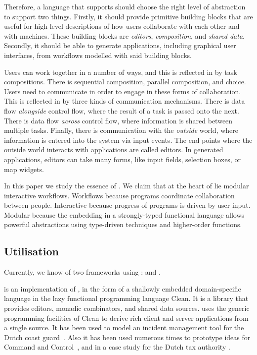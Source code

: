 Therefore,
a language that supports \TOP should choose the right level of abstraction to support two things.
Firstly, it should provide primitive building blocks that are useful for high-level descriptions of how users collaborate with each other and with machines.
These building blocks are \emph{editors}, \emph{composition}, and \emph{shared data}.
Secondly, it should be able to generate applications, including graphical user interfaces, from workflows modelled with said building blocks.

Users can work together in a number of ways, and this is reflected in \TOP by task compositions.
There is sequential composition, parallel composition, and choice.
Users need to communicate in order to engage in these forms of collaboration.
This is reflected in \TOP by three kinds of communication mechanisms.
There is data flow \emph{alongside} control flow, where the result of a task is passed onto the next.
There is data flow \emph{across} control flow, where information is shared between multiple tasks.
Finally, there is communication with the \emph{outside} world, where information is entered into the system via input events.
The end points where the outside world interacts with \TOP applications are called editors.
In generated applications, editors can take many forms, like input fields, selection boxes, or map widgets.

In this paper we study the essence of \TOP.
We claim that at the heart of \TOP lie modular interactive workflows.
Workflows because \TOP programs coordinate collaboration between people.
Interactive because progress of \TOP programs is driven by user input.
Modular because the embedding in a strongly-typed functional language allows powerful abstractions using type-driven techniques and higher-order functions.



\subsection{Utilisation}


Currently, we know of two frameworks using \TOP: \ITASKS and \MTASKS.

\ITASKS is an implementation of \TOP, in the form of a shallowly embedded domain-specific language in the lazy functional programming language Clean.
It is a library that provides editors, monadic combinators, and shared data sources.
\ITASKS uses the generic programming facilities of Clean to derive rich client and server applications from a single source.
It has been used to model an incident management tool for the Dutch coast guard~\cite{conf/iscram/LijnseJP12}.
Also it has been used numerous times to prototype ideas for Command and Control~\cite{theses/nlda/Kool17, theses/radboud/Stutterheim17}, and in a case study for the Dutch tax authority \cite{conf/sfp/StutterheimAP17}.

